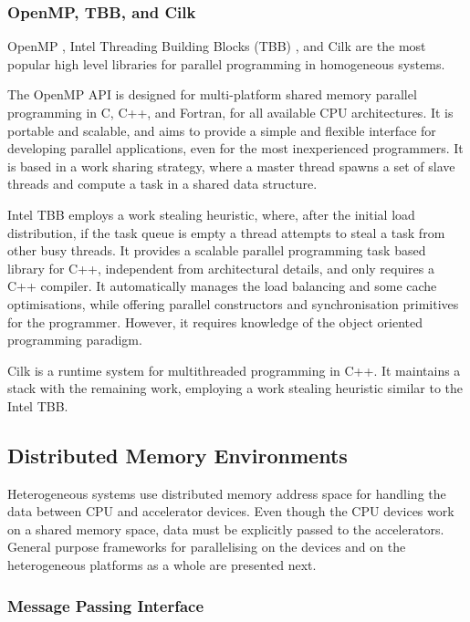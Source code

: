 \subsubsection*{OpenMP, TBB, and Cilk}

OpenMP \cite{OpenMP}, Intel Threading Building Blocks (TBB) \cite{Intel:TBB}, and Cilk \cite{CILK} are the most popular high level libraries for parallel programming in homogeneous systems.

The OpenMP API is designed for multi-platform shared memory parallel programming in C, C++, and Fortran, for all available CPU architectures. It is portable and scalable, and aims to provide a simple and flexible interface for developing parallel applications, even for the most inexperienced programmers. It is based in a work sharing strategy, where a master thread spawns a set of slave threads and compute a task in a shared data structure.

Intel TBB employs a work stealing heuristic, where, after the initial load distribution, if the task queue is empty a thread attempts to steal a task from other busy threads. It provides a scalable parallel programming task based library for C++, independent from architectural details, and only requires a C++ compiler. It automatically manages the load balancing and some cache optimisations, while offering parallel constructors and synchronisation primitives for the programmer. However, it requires knowledge of the object oriented programming paradigm.

Cilk is a runtime system for multithreaded programming in C++. It maintains a stack with the remaining work, employing a work stealing heuristic similar to the Intel TBB.

\subsection{Distributed Memory Environments}
\label{distributed_mem}

Heterogeneous systems use distributed memory address space for handling the data between CPU and accelerator devices. Even though the CPU devices work on a shared memory space, data must be explicitly passed to the accelerators. General purpose frameworks for parallelising on the devices and on the heterogeneous platforms as a whole are presented next.

\subsubsection*{Message Passing Interface}

